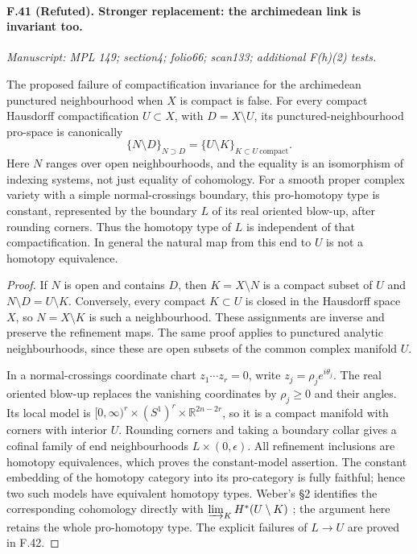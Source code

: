 \paragraph{F.41 (Refuted). Stronger replacement: the archimedean link is invariant too.}
\textit{Manuscript: MPL 149; section4; folio66; scan133; additional F(h)(2) tests.}

The proposed failure of compactification invariance for the archimedean
punctured neighbourhood when $X$ is compact is false. For every compact
Hausdorff compactification $U\subset X$, with $D=X\setminus U$, its
punctured-neighbourhood pro-space is canonically
\[
 \{N\setminus D\}_{N\supset D}
       =\{U\setminus K\}_{K\subset U\ \mathrm{compact}}.
\]
Here $N$ ranges over open neighbourhoods, and the equality is an
isomorphism of indexing systems, not just equality of cohomology.
For a smooth proper complex variety with a simple normal-crossings
boundary, this pro-homotopy type is constant, represented by the boundary
$L$ of its real oriented blow-up, after rounding corners. Thus the
homotopy type of $L$ is independent of that compactification. In general
the natural map from this end to $U$ is not a homotopy equivalence.

\begin{proof}
If $N$ is open and contains $D$, then $K=X\setminus N$ is a compact
subset of $U$ and $N\setminus D=U\setminus K$. Conversely, every compact
$K\subset U$ is closed in the Hausdorff space $X$, so $N=X\setminus K$
is such a neighbourhood. These assignments are inverse and preserve the
refinement maps. The same proof applies to punctured analytic
neighbourhoods, since these are open subsets of the common complex
manifold $U$.

In a normal-crossings coordinate chart $z_1\cdots z_r=0$, write
$z_j=\rho_j e^{i\theta_j}$. The real oriented blow-up replaces the
vanishing coordinates by $\rho_j\geq0$ and their angles. Its local model
is $[0,\infty)^r\times(S^1)^r\times\mathbb R^{2n-2r}$, so it is a
compact manifold with corners with interior $U$. Rounding corners and
taking a boundary collar gives a cofinal family of end neighbourhoods
$L\times(0,\epsilon)$. All refinement inclusions are homotopy
equivalences, which proves the constant-model assertion. The constant
embedding of the homotopy category into its pro-category is fully
faithful; hence two such models have equivalent homotopy types. Weber's
\S2 identifies the corresponding cohomology directly with
$\varinjlim_K H^*(U\setminus K)$ \citep{Weber2012}; the argument here
retains the whole pro-homotopy type. The explicit failures of $L\to U$
are proved in F.42.
\end{proof}


